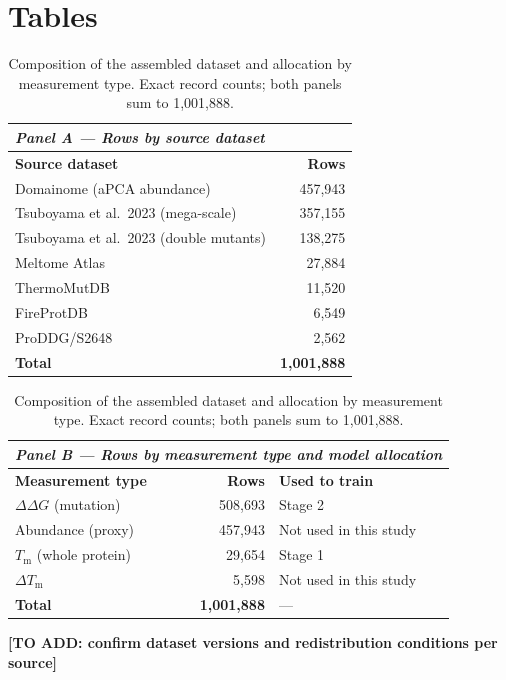 \documentclass[11pt]{article}
\newcommand{\filler}[1]{\colorbox{filleryellow}{\bfseries [TO ADD: #1]}}
\newcommand{\ddg}{\ensuremath{\Delta\Delta G}}
\newcommand{\Tm}{\ensuremath{T_\mathrm{m}}}
\newcommand{\dtm}{\ensuremath{\Delta T_\mathrm{m}}}
\begin{document}
\clearpage
\section*{Tables}

\begin{table}[htbp]
\centering
\caption{Composition of the assembled dataset and allocation by measurement type.
Exact record counts; both panels sum to 1{,}001{,}888.}
\label{tab:data}
\small
\begin{tabular}{lr}
\toprule
\multicolumn{2}{l}{\textit{Panel A --- Rows by source dataset}}\\
\midrule
\textbf{Source dataset} & \textbf{Rows}\\
\midrule
Domainome (aPCA abundance)              & 457,943\\
Tsuboyama et al.\ 2023 (mega-scale)     & 357,155\\
Tsuboyama et al.\ 2023 (double mutants) & 138,275\\
Meltome Atlas                           & 27,884\\
ThermoMutDB                             & 11,520\\
FireProtDB                              & 6,549\\
ProDDG/S2648                            & 2,562\\
\midrule
\textbf{Total}                          & \textbf{1,001,888}\\
\bottomrule
\end{tabular}

\vspace{6pt}
\begin{tabular}{lrl}
\toprule
\multicolumn{3}{l}{\textit{Panel B --- Rows by measurement type and model allocation}}\\
\midrule
\textbf{Measurement type} & \textbf{Rows} & \textbf{Used to train}\\
\midrule
\ddg{} (mutation)     & 508,693 & Stage 2\\
Abundance (proxy)     & 457,943 & Not used in this study\\
\Tm{} (whole protein) & 29,654  & Stage 1\\
\dtm{}                & 5,598   & Not used in this study\\
\midrule
\textbf{Total}        & \textbf{1,001,888} & ---\\
\bottomrule
\end{tabular}

\vspace{3pt}
{\footnotesize \filler{confirm dataset versions and redistribution conditions per source}}
\end{table}
\end{document}
